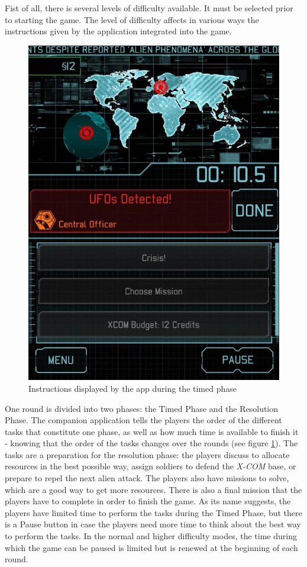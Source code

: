 Fist of all, there is several levels of difficulty available. It must be selected prior to starting the game. The level of difficulty affects in various ways the instructions given by the application integrated into the game.

\begin{figure}[!ht]
    \centering
    \includegraphics[scale=0.3]{Images/xcom_boardgame_app.jpg}
    \caption{Instructions displayed by the app during the timed phase}
    \label{fig:XCOMAPP}
\end{figure}


One round is divided into two phases: the Timed Phase and the Resolution Phase. The companion application tells the players the order of the different tasks that constitute one phase, as well as how much time is available to finish it - knowing that the order of the tasks changes over the rounds (see figure \ref{fig:XCOMAPP}). The tasks are a preparation for the resolution phase: the players discuss to allocate resources in the best possible way, assign soldiers to defend the \textit{X-COM} base, or prepare to repel the next alien attack. 
The players also have missions to solve, which are a good way to get more resources. There is also a final mission that the players have to complete in order to finish the game. As its name suggests, the players have limited time to perform the tasks during the Timed Phase, but there is a Pause button in case the players need more time to think about the best way to perform the tasks. In the normal and higher difficulty modes, the time during which the game can be paused is limited but is renewed at the beginning of each round.

